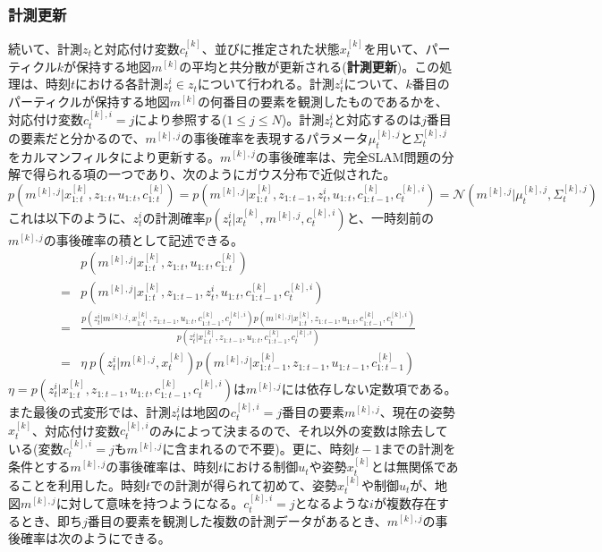 \documentclass[dvipdfmx,a4paper]{jsarticle}
\begin{document}
\subsubsection{計測更新}
続いて、計測$z_t$と対応付け変数$c_t^{[k]}$、並びに推定された状態$x_t^{[k]}$を用いて、パーティクル$k$が保持する地図$m^{[k]}$の平均と共分散が更新される(\textbf{計測更新})。この処理は、時刻$t$における各計測$z_t^i \in z_t$について行われる。計測$z_t^i$について、$k$番目のパーティクルが保持する地図$m^{[k]}$の何番目の要素を観測したものであるかを、対応付け変数$c_t^{[k], i} = j$により参照する($1 \le j \le N$)。計測$z_t^i$と対応するのは$j$番目の要素だと分かるので、$m^{[k], j}$の事後確率を表現するパラメータ$\mu_t^{[k], j}$と$\Sigma_t^{[k], j}$をカルマンフィルタにより更新する。$m^{[k], j}$の事後確率は、完全SLAM問題の分解で得られる項の一つであり、次のようにガウス分布で近似された。
\begin{equation}
	p(m^{[k], j} | x_{1 : t}^{[k]}, z_{1 : t}, u_{1 : t}, c_{1 : t}^{[k]}) = p(m^{[k], j} | x_{1 : t}^{[k]}, z_{1 : t - 1}, z_t^i, u_{1 : t}, c_{1 : t - 1}^{[k]}, c_t^{[k], i}) = \mathcal{N}(m^{[k], j} | \mu_t^{[k], j}, \Sigma_t^{[k], j})
\end{equation}
これは以下のように、$z_t^i$の計測確率$p(z_t^i | x_t^{[k]}, m^{[k], j}, c_t^{[k], i})$と、一時刻前の$m^{[k], j}$の事後確率の積として記述できる。
\begin{eqnarray}
	&& p(m^{[k], j} | x_{1 : t}^{[k]}, z_{1 : t}, u_{1 : t}, c_{1 : t}^{[k]}) \nonumber \\
	&=& p(m^{[k], j} | x_{1 : t}^{[k]}, z_{1 : t - 1}, z_t^i, u_{1 : t}, c_{1 : t - 1}^{[k]}, c_t^{[k], i}) \nonumber \\
	&=& \frac{p(z_t^i | m^{[k], j}, x_{1 : t}^{[k]}, z_{1 : t - 1}, u_{1 : t}, c_{1 : t - 1}^{[k]}, c_t^{[k], i}) p(m^{[k], j} | x_{1 : t}^{[k]}, z_{1 : t - 1}, u_{1 : t}, c_{1 : t - 1}^{[k]}, c_t^{[k], i})}{p(z_t^i | x_{1 : t}^{[k]}, z_{1 : t - 1}, u_{1 : t}, c_{1 : t - 1}^{[k]}, c_t^{[k], i})} \nonumber \\
	&=& \eta \ p(z_t^i | m^{[k], j}, x_t^{[k]}) p(m^{[k], j} | x_{1 : t - 1}^{[k]}, z_{1 : t - 1}, u_{1 : t - 1}, c_{1 : t - 1}^{[k]})
\end{eqnarray}
$\eta = p(z_t^i | x_{1 : t}^{[k]}, z_{1 : t - 1}, u_{1 : t}, c_{1 : t - 1}^{[k]}, c_t^{[k], i})$は$m^{[k], j}$には依存しない定数項である。また最後の式変形では、計測$z_t^i$は地図の$c_t^{[k], i} = j$番目の要素$m^{[k], j}$、現在の姿勢$x_t^{[k]}$、対応付け変数$c_t^{[k], i}$のみによって決まるので、それ以外の変数は除去している(変数$c_t^{[k], i} = j$も$m^{[k], j}$に含まれるので不要)。更に、時刻$t - 1$までの計測を条件とする$m^{[k], j}$の事後確率は、時刻$t$における制御$u_t$や姿勢$x_t^{[k]}$とは無関係であることを利用した。時刻$t$での計測が得られて初めて、姿勢$x_t^{[k]}$や制御$u_t$が、地図$m^{[k], j}$に対して意味を持つようになる。$c_t^{[k], i} = j$となるような$i$が複数存在するとき、即ち$j$番目の要素を観測した複数の計測データがあるとき、$m^{[k], j}$の事後確率は次のようにできる。
\end{document}
